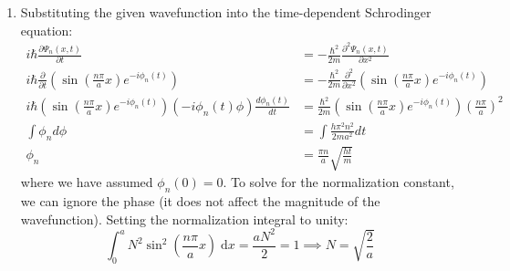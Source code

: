 \begin{sol}
\begin{enumerate}[label=\textbf{(\alph*)}]
\item Substituting the given wavefunction into the time-dependent Schrodinger equation:
\begin{align*}
    i\hbar\frac{\partial\Psi_n(x, t)}{\partial t} 
    &= -\frac{\hbar^2}{2m}\frac{\partial^2\Psi_n(x, t)}{\partial x^2}
    \\
    i\hbar\frac{\partial}{\partial t}\left(\sin{\left(\frac{n\pi}{a}x\right)}e^{-i\phi_n(t)}\right)
    &= -\frac{\hbar^2}{2m}\frac{\partial^2}{\partial x^2}   
        \left(\sin{\left(\frac{n\pi}{a}x\right)}e^{-i\phi_n(t)}\right)
    \\
    i\hbar\left(\sin{\left(\frac{n\pi}{a}x\right)}e^{-i\phi_n(t)}\right)\left(-i\phi_n(t)\phi\right)
        \frac{d \phi_n(t)}{d t}
    &= \frac{\hbar^2}{2m}\left(\sin{\left(\frac{n\pi}{a}x\right)}e^{-i\phi_n(t)}\right)
        \left(\frac{n\pi}{a}\right)^2
    \\
    \int \phi_n d\phi &=\int \frac{h\pi^2n^2}{2ma^2} dt
    \\
    \phi_n &= \frac{\pi n}{a}\sqrt{\frac{ht}{m}}
\end{align*}
where we have assumed $\phi_n(0)=0$.
\newline
To solve for the normalization constant, we can ignore the phase (it does not affect the magnitude of the wavefunction). Setting the normalization integral to unity: $$\int_{0}^{a}N^2\sin^2{\left(\frac{n\pi}{a}x\right)}\;\mathrm{d}x = \frac{aN^2}{2} = 1 \implies N = \sqrt{\frac{2}{a}}$$

\end{enumerate}
\end{sol}
